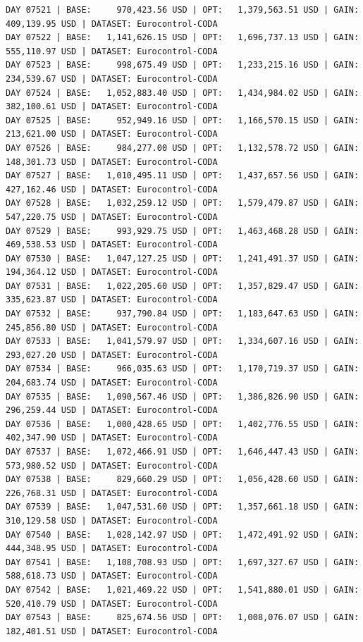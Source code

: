 \documentclass[11pt,a4paper]{article}
\begin{document}
\begin{verbatim}
DAY 07521 | BASE:     970,423.56 USD | OPT:   1,379,563.51 USD | GAIN: 409,139.95 USD | DATASET: Eurocontrol-CODA
DAY 07522 | BASE:   1,141,626.15 USD | OPT:   1,696,737.13 USD | GAIN: 555,110.97 USD | DATASET: Eurocontrol-CODA
DAY 07523 | BASE:     998,675.49 USD | OPT:   1,233,215.16 USD | GAIN: 234,539.67 USD | DATASET: Eurocontrol-CODA
DAY 07524 | BASE:   1,052,883.40 USD | OPT:   1,434,984.02 USD | GAIN: 382,100.61 USD | DATASET: Eurocontrol-CODA
DAY 07525 | BASE:     952,949.16 USD | OPT:   1,166,570.15 USD | GAIN: 213,621.00 USD | DATASET: Eurocontrol-CODA
DAY 07526 | BASE:     984,277.00 USD | OPT:   1,132,578.72 USD | GAIN: 148,301.73 USD | DATASET: Eurocontrol-CODA
DAY 07527 | BASE:   1,010,495.11 USD | OPT:   1,437,657.56 USD | GAIN: 427,162.46 USD | DATASET: Eurocontrol-CODA
DAY 07528 | BASE:   1,032,259.12 USD | OPT:   1,579,479.87 USD | GAIN: 547,220.75 USD | DATASET: Eurocontrol-CODA
DAY 07529 | BASE:     993,929.75 USD | OPT:   1,463,468.28 USD | GAIN: 469,538.53 USD | DATASET: Eurocontrol-CODA
DAY 07530 | BASE:   1,047,127.25 USD | OPT:   1,241,491.37 USD | GAIN: 194,364.12 USD | DATASET: Eurocontrol-CODA
DAY 07531 | BASE:   1,022,205.60 USD | OPT:   1,357,829.47 USD | GAIN: 335,623.87 USD | DATASET: Eurocontrol-CODA
DAY 07532 | BASE:     937,790.84 USD | OPT:   1,183,647.63 USD | GAIN: 245,856.80 USD | DATASET: Eurocontrol-CODA
DAY 07533 | BASE:   1,041,579.97 USD | OPT:   1,334,607.16 USD | GAIN: 293,027.20 USD | DATASET: Eurocontrol-CODA
DAY 07534 | BASE:     966,035.63 USD | OPT:   1,170,719.37 USD | GAIN: 204,683.74 USD | DATASET: Eurocontrol-CODA
DAY 07535 | BASE:   1,090,567.46 USD | OPT:   1,386,826.90 USD | GAIN: 296,259.44 USD | DATASET: Eurocontrol-CODA
DAY 07536 | BASE:   1,000,428.65 USD | OPT:   1,402,776.55 USD | GAIN: 402,347.90 USD | DATASET: Eurocontrol-CODA
DAY 07537 | BASE:   1,072,466.91 USD | OPT:   1,646,447.43 USD | GAIN: 573,980.52 USD | DATASET: Eurocontrol-CODA
DAY 07538 | BASE:     829,660.29 USD | OPT:   1,056,428.60 USD | GAIN: 226,768.31 USD | DATASET: Eurocontrol-CODA
DAY 07539 | BASE:   1,047,531.60 USD | OPT:   1,357,661.18 USD | GAIN: 310,129.58 USD | DATASET: Eurocontrol-CODA
DAY 07540 | BASE:   1,028,142.97 USD | OPT:   1,472,491.92 USD | GAIN: 444,348.95 USD | DATASET: Eurocontrol-CODA
DAY 07541 | BASE:   1,108,708.93 USD | OPT:   1,697,327.67 USD | GAIN: 588,618.73 USD | DATASET: Eurocontrol-CODA
DAY 07542 | BASE:   1,021,469.22 USD | OPT:   1,541,880.01 USD | GAIN: 520,410.79 USD | DATASET: Eurocontrol-CODA
DAY 07543 | BASE:     825,674.56 USD | OPT:   1,008,076.07 USD | GAIN: 182,401.51 USD | DATASET: Eurocontrol-CODA

\end{verbatim}
\end{document}
